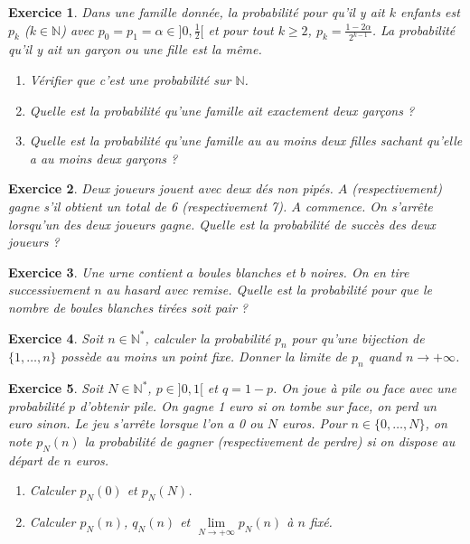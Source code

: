 \documentclass[12pt]{article}
\newtheorem{exercise}{Exercice}[section]
\theoremstyle{remark}
\theoremstyle{remark}
\newcommand{\N}{\mathbb{N}}
\begin{document}
\begin{exercise}
	Dans une famille donnée, la probabilité pour qu'il y ait $k$ enfants est
	$p_{k}$ ($k\in\N$) avec $p_{0}=p_{1}=\alpha\in]0,\frac{1}{2}[$ et pour tout
	$k\geqslant2$, $p_{k}=\frac{1-2\alpha}{2^{k-1}}$. La probabilité qu'il y ait
	un garçon ou une fille est la même.
	\begin{enumerate}
		\item Vérifier que c'est une probabilité sur $\N$.
		\item Quelle est la probabilité qu'une famille ait exactement deux
		garçons ?
		\item Quelle est la probabilité qu'une famille au au moins deux filles
		sachant qu'elle a au moins deux garçons ?
	\end{enumerate}
\end{exercise}

\begin{exercise}
	Deux joueurs jouent avec deux dés non pipés. $A$ (respectivement) gagne s'il obtient un total
	de 6 (respectivement 7). $A$ commence. On s'arrête lorsqu'un des deux
	joueurs gagne. Quelle est la probabilité de succès des deux joueurs ?
\end{exercise}

\begin{exercise}
	Une urne contient $a$ boules blanches et $b$ noires. On en tire
	successivement $n$ au hasard avec remise. Quelle est la probabilité pour que
	le nombre de boules blanches tirées soit pair ?
\end{exercise}

\begin{exercise}
	Soit $n\in\N^{*}$, calculer la probabilité $p_{n}$ pour qu'une bijection de
	$\{1,\dots,n\}$ possède au moins un point fixe. Donner la limite de $p_{n}$
	quand $n\to+\infty$.
\end{exercise}

\begin{exercise}
	Soit $N\in\N^{*}$, $p\in]0,1[$ et $q=1-p$. On joue à pile ou face avec une
	probabilité $p$ d'obtenir pile. On gagne 1 euro si on tombe sur face, on
	perd un euro sinon. Le jeu s'arrête lorsque l'on a 0 ou $N$ euros. Pour
	$n\in\{0,\dots,N\}$, on note $p_{N}(n)$ la probabilité de gagner
	(respectivement de perdre) si on dispose au départ de $n$ euros.
	\begin{enumerate}
		\item Calculer $p_{N}(0)$ et $p_{N}(N)$.
		\item Calculer $p_{N}(n)$, $q_{N}(n)$ et
		$\lim\limits_{N\to+\infty}p_{N}(n)$ à $n$ fixé.
	\end{enumerate}
\end{exercise}
\end{document}
